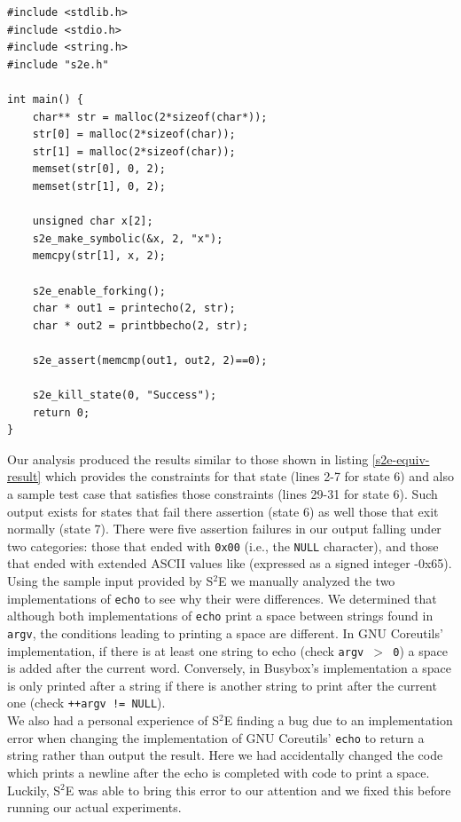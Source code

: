 \documentclass[conference]{IEEEtran}
\begin{document}
\begin{lstlisting}[style=C, label=s2e-equ, abovecaptionskip=2ex, captionpos=b, caption={Program used to perform equivalence testing on GNU Coreutils and Busybox}]
#include <stdlib.h>
#include <stdio.h>
#include <string.h>
#include "s2e.h"

int main() {
	char** str = malloc(2*sizeof(char*));
	str[0] = malloc(2*sizeof(char));
	str[1] = malloc(2*sizeof(char));
	memset(str[0], 0, 2);
	memset(str[1], 0, 2);

	unsigned char x[2];
	s2e_make_symbolic(&x, 2, "x");
	memcpy(str[1], x, 2);

	s2e_enable_forking();
	char * out1 = printecho(2, str);
	char * out2 = printbbecho(2, str);

	s2e_assert(memcmp(out1, out2, 2)==0);
    
	s2e_kill_state(0, "Success");
	return 0;
}
\end{lstlisting}

Our analysis produced the results similar to those shown in listing \ref{s2e-equiv-result} which provides the constraints for that state (lines 2-7 for state 6) and also a sample test case that satisfies those constraints (lines 29-31 for state 6). Such output exists for states that fail there assertion (state 6) as well those that exit normally (state 7). There were five assertion failures in our output falling under two categories: those that ended with {\tt 0x00} (i.e., the {\tt NULL} character), and those that ended with extended ASCII values like {\corner} (expressed as a signed integer -0x65). \\

Using the sample input provided by S$^2$E we manually analyzed the two implementations of {\tt echo} to see why their were differences. We determined that although both implementations of {\tt echo} print a space between strings found in {\tt argv}, the conditions leading to printing a space are different. In GNU Coreutils' implementation, if there is at least one string to echo (check {\tt argv {$>$} 0}) a space is added after the current word. Conversely, in Busybox's implementation a space is only printed after a string if there is another string to print after the current one (check {\tt *++argv !=  NULL}). \\

We also had a personal experience of S$^2$E finding a bug due to an implementation error when changing the implementation of GNU Coreutils' {\tt echo} to return a string rather than output the result. Here we had accidentally changed the code which prints a newline after the echo is completed with code to print a space. Luckily, S$^2$E was able to bring this error to our attention and we fixed this before running our actual experiments. \\
\end{document}
